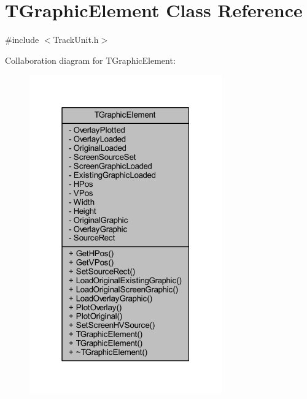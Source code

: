 \hypertarget{class_t_graphic_element}{}\section{T\+Graphic\+Element Class Reference}
\label{class_t_graphic_element}


{\ttfamily \#include $<$Track\+Unit.\+h$>$}



Collaboration diagram for T\+Graphic\+Element\+:\nopagebreak
\begin{figure}[H]
\begin{center}
\leavevmode
\includegraphics[width=235pt]{class_t_graphic_element__coll__graph}
\end{center}
\end{figure}
